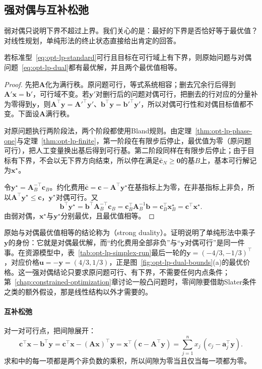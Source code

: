 \subsection{强对偶与互补松弛}
\label{sec:opt-lp-strong-duality}

弱对偶只说明下界不超过上界。我们关心的是：最好的下界是否恰好等于最优值？对线性规划，单纯形法的终止状态直接给出肯定的回答。

\begin{theorem}[线性规划强对偶]
\label{thm:opt-lp-strong-duality}
若标准型~\eqref{eq:opt-lp-standard}可行且目标在可行域上有下界，则原始问题与对偶问题~\eqref{eq:opt-lp-dual}都有最优解，并且两个最优值相等。
\end{theorem}

\begin{proof}
先把$\bm A$化为满行秩。原问题可行，等式系统相容；删去冗余行后得到$\bm A'\bm x=\bm b'$，可行域不变。若$\bm y'$对删行后的问题对偶可行，把删去的行对应的分量补为零得到$\bm y$，则$\bm A^\top\bm y=\bm A'^\top\bm y'$、$\bm b^\top\bm y=\bm b'^\top\bm y'$，所以对偶可行性和对偶目标值都不变。下面设$\bm A$满行秩。

对原问题执行两阶段法，两个阶段都使用Bland规则。由定理~\ref{thm:opt-lp-phase-one}与定理~\ref{thm:opt-lp-finite}，第一阶段在有限步后停止，最优值为零（原问题可行），把人工变量换出基后得到可行基。第二阶段同样在有限步后停止；由于目标有下界，不会以无下界方向结束，所以停在满足$\bar{\bm c}_N\ge\bm 0$的基$B$上，基本可行解记为$\bm x^\star$。

令$\bm y^\star=\bm A_B^{-\top}\bm c_B$。约化费用$\bar{\bm c}=\bm c-\bm A^\top\bm y^\star$在基指标上为零，在非基指标上非负，所以$\bm A^\top\bm y^\star\le\bm c$，$\bm y^\star$对偶可行。又
\[
  \bm b^\top\bm y^\star=\bm b^\top\bm A_B^{-\top}\bm c_B=\bm c_B^\top\bm A_B^{-1}\bm b=\bm c_B^\top\bm x^\star_B=\bm c^\top\bm x^\star.
\]
由弱对偶，$\bm x^\star$与$\bm y^\star$分别最优，且最优值相等。
\end{proof}

原始与对偶最优值相等的结论称为（strong duality）。证明说明了单纯形法中乘子$\bm y$的身份：它就是对偶最优解，而“约化费用全部非负”与“$\bm y$对偶可行”是同一件事。在资源模型中，表~\ref{tab:opt-lp-simplex-run}最后一轮的$\bm y=(-4/3,-1/3)^\top$，对应价格$\bm u=-\bm y=(4/3,1/3)$，正是图~\ref{fig:opt-lp-dual-bounds}(a)的最优价格。这一强对偶结论只要求原问题可行、有下界，不需要任何内点条件；第~\ref{chap:constrained-optimization}章讨论一般凸问题时，零间隙要借助Slater条件之类的额外假设，那是线性结构以外才需要的。

\paragraph{互补松弛}
对一对可行点，把间隙展开：
\[
  \bm c^\top\bm x-\bm b^\top\bm y=\bm c^\top\bm x-(\bm A\bm x)^\top\bm y=\bm x^\top(\bm c-\bm A^\top\bm y)=\sum_{j=1}^nx_j\,(c_j-\bm a_j^\top\bm y).
\]
求和中的每一项都是两个非负数的乘积，所以间隙为零当且仅当每一项都为零。

